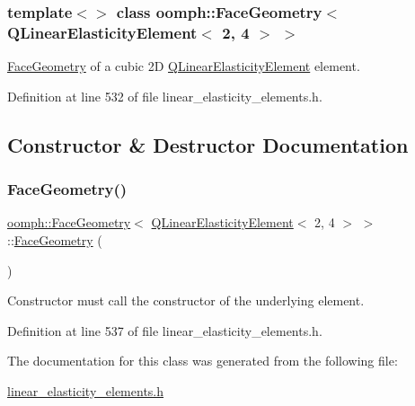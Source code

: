 \subsubsection*{template$<$$>$\newline
class oomph\+::\+Face\+Geometry$<$ Q\+Linear\+Elasticity\+Element$<$ 2, 4 $>$ $>$}

\hyperlink{classoomph_1_1FaceGeometry}{Face\+Geometry} of a cubic 2D \hyperlink{classoomph_1_1QLinearElasticityElement}{Q\+Linear\+Elasticity\+Element} element. 

Definition at line 532 of file linear\+\_\+elasticity\+\_\+elements.\+h.



\subsection{Constructor \& Destructor Documentation}
\mbox{\label{classoomph_1_1FaceGeometry_3_01QLinearElasticityElement_3_012_00_014_01_4_01_4_addf03636ffdb4240ccb8126f4aaaacd2}} 
\subsubsection{\texorpdfstring{Face\+Geometry()}{FaceGeometry()}}
{\footnotesize\ttfamily \hyperlink{classoomph_1_1FaceGeometry}{oomph\+::\+Face\+Geometry}$<$ \hyperlink{classoomph_1_1QLinearElasticityElement}{Q\+Linear\+Elasticity\+Element}$<$ 2, 4 $>$ $>$\+::\hyperlink{classoomph_1_1FaceGeometry}{Face\+Geometry} (\begin{DoxyParamCaption}{ }\end{DoxyParamCaption})\hspace{0.3cm}{\ttfamily [inline]}}



Constructor must call the constructor of the underlying element. 



Definition at line 537 of file linear\+\_\+elasticity\+\_\+elements.\+h.



The documentation for this class was generated from the following file\+:\begin{DoxyCompactItemize}
\item 
\hyperlink{linear__elasticity__elements_8h}{linear\+\_\+elasticity\+\_\+elements.\+h}\end{DoxyCompactItemize}
